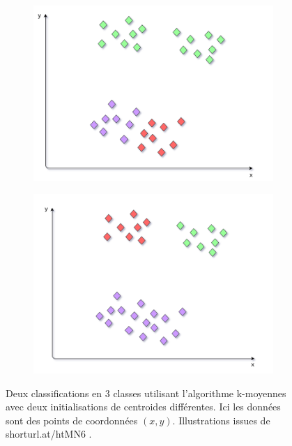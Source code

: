 \begin{figure}[ht]
  \centering
  \begin{subfigure}{.49\textwidth}
    \centering
    \includegraphics[width=.9\linewidth]{./Chapitre2/figures/kmeans1.png}
  \end{subfigure}
  \begin{subfigure}{.49\textwidth}
    \centering
    \includegraphics[width=.9\linewidth]{./Chapitre2/figures/kmeans2.png}
  \end{subfigure}
  \caption{Deux classifications en 3 classes utilisant l'algorithme k-moyennes avec deux initialisations de centroides différentes. Ici les données sont des points de coordonnées $(x,y)$. Illustrations issues de shorturl.at/htMN6 .}
  \label{fig:kmeans}
\end{figure}
